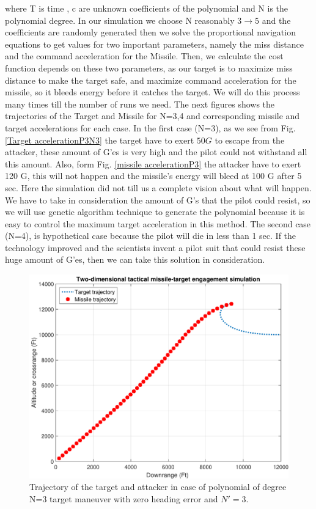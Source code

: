 where T is time , c are unknown coefficients of the polynomial and N is the polynomial degree.
In our simulation we choose N reasonably $3\to5$ and the coefficients are randomly generated then we solve the proportional navigation equations to get values for two important parameters, namely the miss distance and the command acceleration for the Missile. Then, we calculate the cost function depends on these two parameters, as our target is to maximize miss distance to make the target safe, and maximize command acceleration for the missile, so it bleeds energy before it catches the target. We will do this process many times till the number of runs we need. The next figures shows the trajectories of the Target and Missile for N=3,4 and corresponding missile and target accelerations for each case.
In the first case (N=3), as we see from Fig. \ref{Target accelerationP3N3} the target have to exert $50 G$ to escape from the attacker, these amount of G'es is very high and the pilot could not withstand all this amount. Also, form Fig. \ref{missile accelerationP3} the attacker have to exert 120 G, this will not happen and the missile's energy will bleed at 100 G after 5 sec. Here the simulation did not till us a complete vision about what will happen. We have to take in consideration the amount of G's that the pilot could resist, so we will use genetic algorithm technique to generate the polynomial because it is easy to control the maximum target acceleration in this method.
The second case (N=4), is hypothetical case because the pilot will die in less than 1 sec. If the technology improved and the scientists invent a pilot suit that could resist these huge amount of G'es, then we can take this solution in consideration.        

\begin{figure}[H]
	\centering
	\includegraphics[scale = 0.55]{fig/trajectoryP3N3.pdf}
	\caption{Trajectory of the target and attacker in case of polynomial of degree N=3 target maneuver with zero heading error and $N'=3$.}
	\label{trajectoryP3}
\end{figure}


